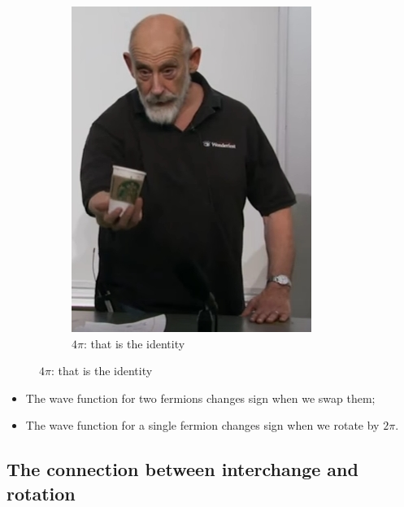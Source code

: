 \documentclass[]{article}
\begin{document}
\begin{figure}[H]
\begin{subfigure}{0.45\textwidth}
	\end{subfigure}
	\begin{subfigure}{0.45\textwidth}
		\caption{$4\pi$: that is the identity}
		\includegraphics[width=\textwidth]{aqm-5-coffee-cup4}
	\end{subfigure}
\end{figure}

\begin{itemize}
	\item The wave function for two fermions changes sign when we swap them;
	\item The wave function for a single fermion changes sign when we rotate by $2\pi$.
\end{itemize}

\subsection{The connection between interchange and rotation}
\end{document}

